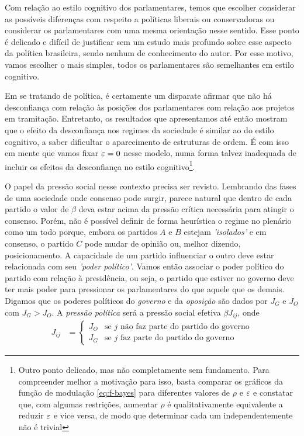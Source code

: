 Com relação ao estilo cognitivo dos parlamentares, temos que escolher considerar as possíveis diferenças com respeito a políticas liberais ou conservadoras ou considerar os parlamentares com uma mesma orientação nesse sentido.
Esse ponto é delicado e difícil de justificar sem um estudo mais profundo sobre esse aspecto da política brasileira, sendo nenhum de conhecimento do autor.
Por esse motivo, vamos escolher o mais simples, todos os parlamentares são semelhantes em estilo cognitivo.

Em se tratando de política, é certamente um disparate afirmar que não há desconfiança com relação às posições dos parlamentares com relação aos projetos em tramitação.
Entretanto, os resultados que apresentamos até então mostram que o efeito da desconfiança nos regimes da sociedade é similar ao do estilo cognitivo, a saber dificultar o aparecimento de estruturas de ordem.
É com isso em mente que vamos fixar $\varepsilon=0$ nesse modelo, numa forma talvez inadequada de incluir os efeitos da desconfiança no estilo cognitivo\footnote{Outro ponto delicado, mas não completamente sem fundamento.
Para compreender melhor a motivação para isso, basta comparar os gráficos da função de modulação \eqref{eq:f-bayes} para diferentes valores de $\rho$ e $\varepsilon$ e constatar que, com algumas restrições, aumentar $\rho$ é qualitativamente equivalente a reduzir $\varepsilon$ e vice versa, de modo que determinar cada um independentemente não é trivial}.

O papel da pressão social nesse contexto precisa ser revisto.
Lembrando das fases de uma sociedade onde consenso pode surgir, parece natural que dentro de cada partido o valor de $\beta$ deva estar acima da pressão crítica necessária para atingir o consenso.
Porém, não é possível definir de forma heurística o regime no plenário como um todo porque, embora os partidos $A$ e $B$ estejam \emph{'isolados'} e em consenso, o partido $C$ pode mudar de opinião ou, melhor dizendo, posicionamento.
A capacidade de um partido influenciar o outro deve estar relacionada com seu  \emph{'poder político'}.
Vamos então associar o poder político do partido com relação à presidência, ou seja, o partido que estiver no governo deve ter mais poder para pressionar os parlamentares do que aquele que os demais.
Digamos que os poderes políticos do \emph{governo} e da \emph{oposição} são dados por $J_G$ e $J_O$ com $J_G > J_O$.
A \emph{pressão política} será a pressão social efetiva $\beta J_{ij}$, onde
\begin{align}
    J_{ij} & = \begin{cases}
        J_O & \text{se $j$ não faz parte do partido do governo}\\
        J_G & \text{se $j$ faz parte do partido do governo}
\end{cases}
\end{align}

